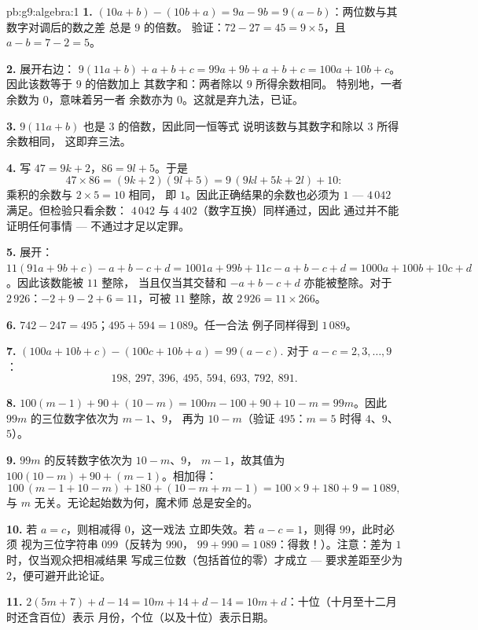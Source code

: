 \begin{solution}{pb:g9:algebra:1}
\textbf{1.} $(10a + b) - (10b + a) = 9a - 9b = 9(a - b)$：两位数与其数字对调后的数之差
总是 $9$ 的倍数。
验证：$72 - 27 = 45 = 9 \times 5$，且
$a - b = 7 - 2 = 5$。

\textbf{2.} 展开右边：
$9(11a + b) + a + b + c = 99a + 9b + a + b + c
= 100a + 10b + c$。因此该数等于 $9$ 的倍数加上
其数字和：两者除以 $9$ 所得余数相同。
特别地，一者余数为 $0$，意味着另一者
余数亦为 $0$。这就是弃九法，已证。

\textbf{3.} $9(11a + b)$ 也是 $3$ 的倍数，因此同一恒等式
说明该数与其数字和除以 $3$ 所得余数相同，
这即弃三法。

\textbf{4.} 写 $47 = 9k + 2$，$86 = 9l + 5$。于是
\[
47 \times 86 = (9k + 2)(9l + 5)
= 9\,(9kl + 5k + 2l) + 10 :
\]
乘积的余数与 $2 \times 5 = 10$ 相同，
即 $1$。因此正确结果的余数也必须为
$1$ --- $4\,042$ 满足。但检验只看余数：
$4\,042$ 与 $4\,402$（数字互换）同样通过，因此
通过并不能证明任何事情 --- 不通过才足以定罪。

\textbf{5.} 展开：$11(91a + 9b + c) - a + b - c + d
= 1001a + 99b + 11c - a + b - c + d
= 1000a + 100b + 10c + d$。因此该数能被 $11$ 整除，
当且仅当其交替和 $-a + b - c + d$ 亦能被整除。对于
$2\,926$：$-2 + 9 - 2 + 6 = 11$，可被 $11$ 整除，故
$2\,926 = 11 \times 266$。

\textbf{6.} $742 - 247 = 495$；$495 + 594 = 1\,089$。任一合法
例子同样得到 $1\,089$。

\textbf{7.} $(100a + 10b + c) - (100c + 10b + a) = 99(a - c)$.
对于 $a - c = 2, 3, \dots, 9$：
\[
198,\ 297,\ 396,\ 495,\ 594,\ 693,\ 792,\ 891 .
\]

\textbf{8.} $100(m - 1) + 90 + (10 - m) = 100m - 100 + 90 + 10
- m = 99m$。因此 $99m$ 的三位数字依次为 $m - 1$、$9$，
再为 $10 - m$（验证 $495$：$m = 5$ 时得 $4$、$9$、$5$）。

\textbf{9.} $99m$ 的反转数字依次为 $10 - m$、$9$，
$m - 1$，故其值为 $100(10 - m) + 90 + (m - 1)$。相加得：
\[
100\,(m - 1 + 10 - m) + 180 + (10 - m + m - 1)
= 100 \times 9 + 180 + 9 = 1\,089 ,
\]
与 $m$ 无关。无论起始数为何，魔术师
总是安全的。

\textbf{10.} 若 $a = c$，则相减得 $0$，这一戏法
立即失效。若 $a - c = 1$，则得 $99$，此时必须
视为三位字符串 $099$（反转为 $990$，
$99 + 990 = 1\,089$：得救！）。注意：差为
$1$ 时，仅当观众把相减结果
写成三位数（包括首位的零）才成立 --- 要求差距至少为
$2$，便可避开此论证。

\textbf{11.} $2(5m + 7) + d - 14 = 10m + 14 + d - 14 =
10m + d$：十位（十月至十二月时还含百位）表示
月份，个位（以及十位）表示日期。


\end{solution}
